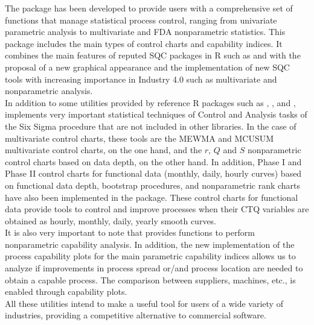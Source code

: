 The  package has been developed to provide users with a comprehensive set of functions that manage statistical process control, ranging from univariate parametric analysis to multivariate and FDA nonparametric statistics.
This package includes the main types of control charts and capability indices.
It combines the main features of reputed SQC packages in R such as  and  with the proposal of a new graphical appearance and the implementation of new SQC tools with increasing importance in Industry 4.0 such as multivariate and nonparametric analysis.\\
In addition to some utilities provided by reference R packages such as , , and ,  implements very important statistical techniques of Control and Analysis tasks of the Six Sigma procedure that are not included in other libraries. 
In the case of multivariate control charts, these tools are the MEWMA and MCUSUM multivariate control charts, on the one hand, and the $r$, $Q$ and $S$ nonparametric control charts based on data depth, on the other hand. In addition, Phase I and Phase II control charts for functional data (monthly, daily, hourly curves) based on functional data depth, bootstrap procedures, and nonparametric rank charts have also been implemented in the  package. These control charts for functional data provide tools to control and improve processes when their CTQ variables are obtained as hourly, monthly, daily, yearly smooth curves.\\
It is also very important to note that  provides functions to perform nonparametric capability analysis. 
In addition, the new implementation of the process capability plots for the main parametric capability indices allows us to analyze if improvements in process spread or/and process location are needed to obtain a capable process. 
The comparison between suppliers, machines, etc., is enabled through capability plots.\\
All these utilities intend to make  a useful tool for users of a wide variety of industries, providing a competitive alternative to commercial software.

% 


